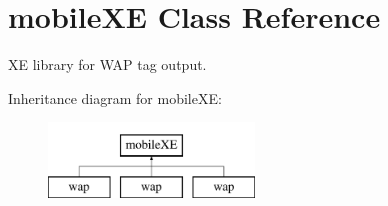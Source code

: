 \hypertarget{classmobileXE}{\section{mobile\-X\-E Class Reference}
\label{classmobileXE}
}


X\-E library for W\-A\-P tag output.  


Inheritance diagram for mobile\-X\-E\-:\begin{figure}[H]
\begin{center}
\leavevmode
\includegraphics[height=2.000000cm]{classmobileXE}
\end{center}
\end{figure}
